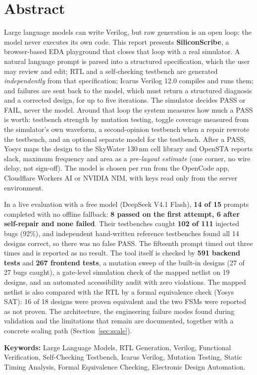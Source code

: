 \chapter*{\center \Large Abstract}

Large language models can write Verilog, but raw generation is an open loop: the
model never executes its own code. This report presents \textbf{SiliconScribe}, a
browser-based EDA playground that closes that loop with a real simulator. A natural
language prompt is parsed into a structured specification, which the user may review
and edit; RTL and a self-checking testbench are generated \emph{independently} from
that specification; Icarus Verilog 12.0 compiles and runs them; and failures are
sent back to the model, which must return a structured diagnosis and a corrected
design, for up to five iterations. The simulator decides PASS or FAIL, never the
model. Around that loop the system measures how much a PASS is worth: testbench
strength by mutation testing, toggle coverage measured from the simulator's own
waveform, a second-opinion testbench when a repair rewrote the testbench, and an
optional separate model for the testbench. After a PASS, Yosys maps the design to the
SkyWater 130\,nm cell library and OpenSTA reports slack, maximum frequency and area as
a \emph{pre-layout estimate} (one corner, no wire delay, not sign-off). The model is
chosen per run from the OpenCode app, Cloudflare Workers AI or NVIDIA NIM, with keys
read only from the server environment.

In a live evaluation with a free model (DeepSeek V4.1 Flash), \textbf{14 of 15}
prompts completed with no offline fallback: \textbf{8 passed on the first attempt,
6 after self-repair and none failed}. Their testbenches caught \textbf{102 of 111}
injected bugs (92\%), and independent hand-written reference testbenches found all 14
designs correct, so there was no false PASS. The fifteenth prompt timed out three
times and is reported as no result. The tool itself is checked by \textbf{591 backend
tests} and \textbf{267 frontend tests}, a mutation sweep of the built-in designs
(27 of 27 bugs caught), a gate-level simulation check of the mapped netlist on 19
designs, and an automated accessibility audit with zero violations. The mapped netlist
is also compared with the RTL by a formal equivalence check (Yosys SAT): 16 of 18
designs were proven equivalent and the two FSMs were reported as not proven. The architecture, the
engineering failure modes found during validation and the limitations that remain
are documented, together with a concrete scaling path (Section~\ref{sec:scale}).

\vspace{0.5cm}
\noindent
\textbf{Keywords:} Large Language Models, RTL Generation, Verilog, Functional Verification, Self-Checking Testbench, Icarus Verilog, Mutation Testing, Static Timing Analysis, Formal Equivalence Checking, Electronic Design Automation.
